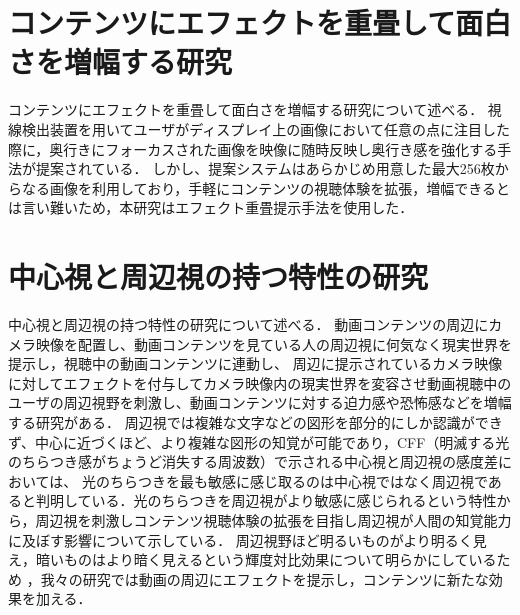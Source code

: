 \section{コンテンツにエフェクトを重畳して面白さを増幅する研究}
コンテンツにエフェクトを重畳して面白さを増幅する研究について述べる．
視線検出装置を用いてユーザがディスプレイ上の画像において任意の点に注目した際に，奥行きにフォーカスされた画像を映像に随時反映し奥行き感を強化する手法が提案されている\cite{shamo1,shamo2}．
しかし、提案システムはあらかじめ用意した最大256枚からなる画像を利用しており，手軽にコンテンツの視聴体験を拡張，増幅できるとは言い難いため\cite{shamo3}，本研究はエフェクト重畳提示手法を使用した． 

\section{中心視と周辺視の持つ特性の研究}
中心視と周辺視の持つ特性の研究について述べる．
動画コンテンツの周辺にカメラ映像を配置し、動画コンテンツを見ている人の周辺視に何気なく現実世界を提示し，視聴中の動画コンテンツに連動し、
周辺に提示されているカメラ映像に対してエフェクトを付与してカメラ映像内の現実世界を変容させ動画視聴中のユーザの周辺視野を刺激し、動画コンテンツに対する迫力感や恐怖感などを増幅する研究がある\cite{shamo4}．
周辺視では複雑な文字などの図形を部分的にしか認識ができず、中心に近づくほど、より複雑な図形の知覚が可能であり\cite{shamo5}，CFF（明滅する光のちらつき感がちょうど消失する周波数）で示される中心視と周辺視の感度差においては、
光のちらつきを最も敏感に感じ取るのは中心視ではなく周辺視であると判明している\cite{shamo6}．光のちらつきを周辺視がより敏感に感じられるという特性から，周辺視を刺激しコンテンツ視聴体験の拡張を目指し周辺視が人間の知覚能力に及ぼす影響について示している\cite{shamo7}．
周辺視野ほど明るいものがより明るく見え，暗いものはより暗く見えるという輝度対比効果について明らかにしているため \cite{shamo8}，我々の研究では動画の周辺にエフェクトを提示し，コンテンツに新たな効果を加える．

